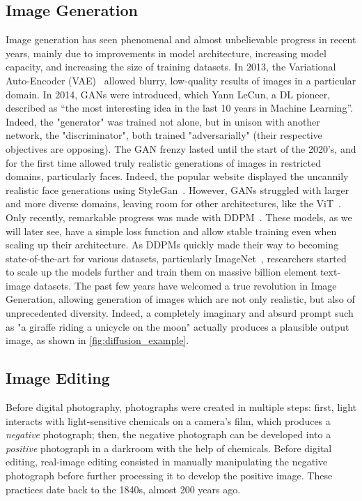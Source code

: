 \subsection{Image Generation}
Image generation has seen phenomenal and almost unbelievable progress in recent years, mainly due to improvements in model architecture, 
increasing model capacity, and increasing the size of training datasets.
In 2013, the Variational Auto-Encoder (\ac{VAE})~\citep{Kingma2014} allowed blurry, low-quality results of images in a particular domain. In 2014,
\ac{GAN}s were introduced, which Yann LeCun, a \ac{DL} pioneer, described as “the most interesting idea 
 in the last 10 years in Machine Learning”. Indeed, the "generator" was trained not alone, but in unison with another network, the "discriminator",
 both trained "adversarially" (their respective objectives are opposing). The \ac{GAN} frenzy lasted until the start of the 2020's, and for the
  first time  allowed truly realistic generations of images in restricted domains, particularly faces. Indeed, the popular website
    displayed the uncannily realistic face generations using StyleGan~\citep{karra2019stylegan, karra2020stylegan2}.
    However, \ac{GAN}s struggled with 
   larger and more diverse domains, leaving room for other architectures, like the \ac{ViT}~\citep{esser2021taming, ramesh2021zero, ding2021cogview}.
    Only recently,
   remarkable progress was made with \ac{DDPM}~\citep{ho2020denoising,nichol2021glide, rombach2022high, ramesh2022hierarchical, saharia2022photorealistic}. 
   These models, as we will later see, have a simple loss function and allow stable training even when scaling up their architecture.
   As \ac{DDPM}s quickly made their way to becoming state-of-the-art for various datasets, particularly ImageNet~\citep{deng2009imagenet}, researchers
   started to scale up the models further and train them on massive billion element text-image datasets. The past few years have welcomed
   a true revolution in Image Generation, allowing generation of images which are not only realistic, but also of unprecedented diversity.
   Indeed, a completely imaginary and absurd prompt such as "a giraffe riding a unicycle on the moon" actually produces a  plausible 
   output image, as shown in \ref{fig:diffusion_example}.



   

\subsection{Image Editing}
Before digital photography, photographs were created in multiple steps: first, light interacts with light-sensitive chemicals on 
a camera's film, which produces a \emph{negative} photograph; then, the negative photograph can be developed into a \emph{positive} 
photograph in a darkroom with the help of chemicals. Before digital editing, real-image editing 
consisted in manually manipulating the negative 
photograph before further processing it to develop the positive image. These practices date back to the 1840s, almost 200 years ago.

